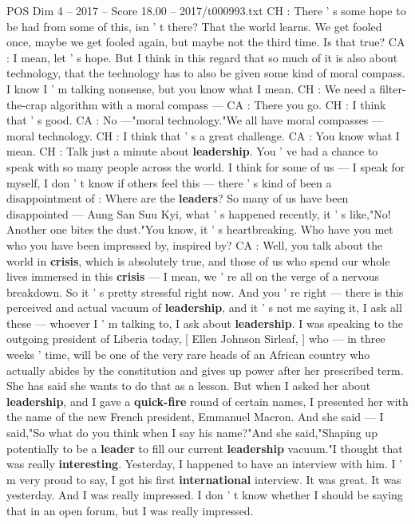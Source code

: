 \begin{textsample}{POS Dim 4 – 2017 – Score 18.00 – 2017/t000993.txt}
CH : There ' s some hope to be had from some of this, isn ' t there?
That the world learns.
We get fooled once, maybe we get fooled again, but maybe not the third time.
Is that true?
CA : I mean, let ' s hope.
But I think in this regard that so much of it is also about technology, that the technology has to also be given some kind of moral compass.
I know I ' m talking nonsense, but you know what I mean.
CH : We need a filter-the-crap algorithm with a moral compass — CA : There you go.
CH : I think that ' s good.
CA : No —"moral technology."We all have moral compasses — moral technology.
CH : I think that ' s a great challenge.
CA : You know what I mean.
CH : Talk just a minute about \textbf{leadership}.
You ' ve had a chance to speak with so many people across the world.
I think for some of us — I speak for myself, I don ' t know if others feel this — there ' s kind of been a disappointment of : Where are the \textbf{leaders}?
So many of us have been disappointed — Aung San Suu Kyi, what ' s happened recently, it ' s like,"No!
Another one bites the dust."You know, it ' s heartbreaking.
Who have you met who you have been impressed by, inspired by?
CA : Well, you talk about the world in \textbf{crisis}, which is absolutely true, and those of us who spend our whole lives immersed in this \textbf{crisis} — I mean, we ' re all on the verge of a nervous breakdown.
So it ' s pretty stressful right now.
And you ' re right — there is this perceived and actual vacuum of \textbf{leadership}, and it ' s not me saying it, I ask all these — whoever I ' m talking to, I ask about \textbf{leadership}.
I was speaking to the outgoing president of Liberia today, [ Ellen Johnson Sirleaf, ] who — in three weeks ' time, will be one of the very rare heads of an African country who actually abides by the constitution and gives up power after her prescribed term.
She has said she wants to do that as a lesson.
But when I asked her about \textbf{leadership}, and I gave a \textbf{quick-fire} round of certain names, I presented her with the name of the new French president, Emmanuel Macron.
And she said — I said,"So what do you think when I say his name?"And she said,"Shaping up potentially to be a \textbf{leader} to fill our current \textbf{leadership} vacuum."I thought that was really \textbf{interesting}.
Yesterday, I happened to have an interview with him.
I ' m very proud to say, I got his first \textbf{international} interview.
It was great.
It was yesterday.
And I was really impressed.
I don ' t know whether I should be saying that in an open forum, but I was really impressed.

\end{textsample}
